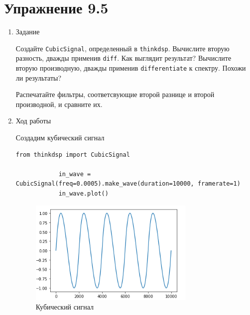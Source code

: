 \documentclass[a4paper,12pt]{article}
\begin{document}
	\section{Упражнение 9.5}
	
	\begin{enumerate}
		
		\item{Задание}
		
		Создайте \texttt{CubicSignal}, определенный в \texttt{thinkdsp}. Вычислите вторую разность, дважды применив \texttt{diff}. Как выглядит результат? Вычислите вторую производную, дважды применив \texttt{differentiate} к спектру. Похожи ли результаты?
		
		Распечатайте фильтры, соответсвующие второй разнице и второй производной, и сравните их.
		
		\item{Ход работы}
		
		Создадим кубический сигнал
		\begin{lstlisting}[caption=Создаем пилообразный сигнал]
			from thinkdsp import CubicSignal
			
			in_wave = CubicSignal(freq=0.0005).make_wave(duration=10000, framerate=1)
			in_wave.plot()
		\end{lstlisting}
		\begin{figure}[H]
			\centering
			\includegraphics[width=0.75\textwidth]{5_1.png}
			\caption{Кубический сигнал}
			\label{fig:5.1}
		\end{figure}
		

\end{enumerate}
\end{document}
